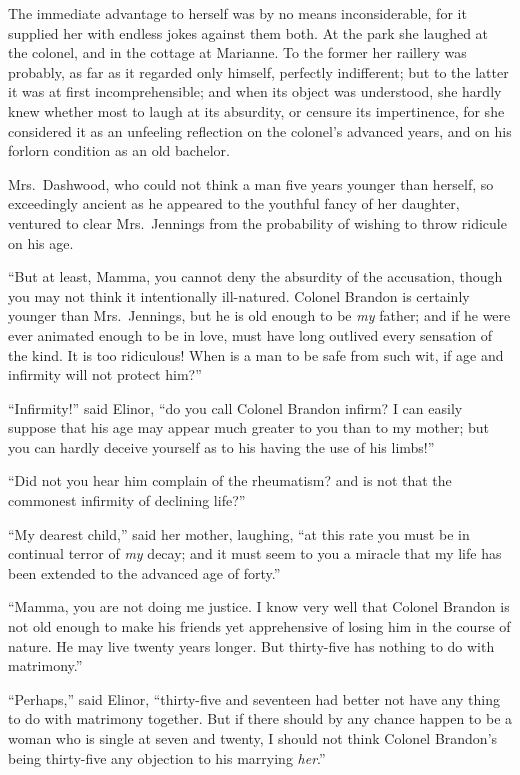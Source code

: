 The immediate advantage to herself was by no means
inconsiderable, for it supplied her with endless jokes
against them both.  At the park she laughed at the colonel,
and in the cottage at Marianne.  To the former her
raillery was probably, as far as it regarded only himself,
perfectly indifferent; but to the latter it was at
first incomprehensible; and when its object was understood,
she hardly knew whether most to laugh at its absurdity,
or censure its impertinence, for she considered it as an
unfeeling reflection on the colonel's advanced years,
and on his forlorn condition as an old bachelor.

Mrs.\ Dashwood, who could not think a man five years
younger than herself, so exceedingly ancient as he appeared
to the youthful fancy of her daughter, ventured to clear
Mrs.\ Jennings from the probability of wishing to throw
ridicule on his age.

``But at least, Mamma, you cannot deny the absurdity
of the accusation, though you may not think it intentionally
ill-natured.  Colonel Brandon is certainly younger than
Mrs.\ Jennings, but he is old enough to be \emph{my} father;
and if he were ever animated enough to be in love,
must have long outlived every sensation of the kind.
It is too ridiculous!  When is a man to be safe from such wit,
if age and infirmity will not protect him?''

``Infirmity!'' said Elinor, ``do you call Colonel Brandon
infirm?  I can easily suppose that his age may appear much
greater to you than to my mother; but you can hardly
deceive yourself as to his having the use of his limbs!''

``Did not you hear him complain of the rheumatism?
and is not that the commonest infirmity of declining life?''

``My dearest child,'' said her mother, laughing,
``at this rate you must be in continual terror of \emph{my} decay;
and it must seem to you a miracle that my life has been
extended to the advanced age of forty.''

``Mamma, you are not doing me justice.  I know very well
that Colonel Brandon is not old enough to make his friends
yet apprehensive of losing him in the course of nature.
He may live twenty years longer.  But thirty-five has
nothing to do with matrimony.''

``Perhaps,'' said Elinor, ``thirty-five and seventeen had
better not have any thing to do with matrimony together.
But if there should by any chance happen to be a woman
who is single at seven and twenty, I should not think
Colonel Brandon's being thirty-five any objection to his
marrying \emph{her}.''

